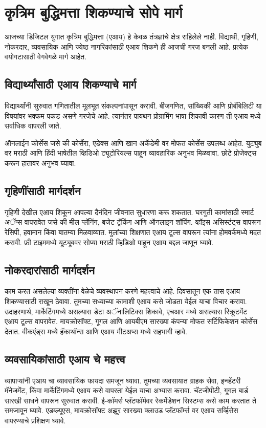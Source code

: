 \chapter{कृत्रिम बुद्धिमत्ता शिकण्याचे सोपे मार्ग}

आजच्या डिजिटल युगात कृत्रिम बुद्धिमत्ता (एआय) हे केवळ तंत्रज्ञांचे क्षेत्र राहिलेले नाही. विद्यार्थी, गृहिणी, नोकरदार, व्यवसायिक आणि ज्येष्ठ नागरिकांसाठी एआय शिकणे ही आजची गरज बनली आहे. प्रत्येक वयोगटासाठी वेगवेगळे मार्ग आहेत.

\section*{विद्यार्थ्यांसाठी एआय शिकण्याचे मार्ग}

विद्यार्थ्यांनी सुरुवात गणितातील मूलभूत संकल्पनांपासून करावी. बीजगणित, सांख्यिकी आणि प्रोबॅबिलिटी या विषयांवर भक्कम पकड असणे गरजेचे आहे. त्यानंतर पायथन प्रोग्रामिंग भाषा शिकावी कारण ती एआय मध्ये सर्वाधिक वापरली जाते.

ऑनलाईन कोर्सेस जसे की कोर्सेरा, एडेक्स  आणि खान अकॅडेमी वर मोफत कोर्सेस उपलब्ध आहेत. युट्युब  वर मराठी आणि हिंदी भाषेतील व्हिडिओ ट्यूटोरियल्स पाहून व्यावहारिक अनुभव मिळवावा. छोटे प्रोजेक्ट्स करून हातावर अनुभव घ्यावा.

\section*{गृहिणींसाठी  मार्गदर्शन}
गृहिणी देखील एआय शिकून आपल्या दैनंदिन जीवनात सुधारणा करू शकतात. घरगुती कामांसाठी स्मार्ट अॅप्स वापरावेत जसे की मील प्लॅनिंग, बजेट ट्रॅकिंग आणि ऑनलाइन शॉपिंग. व्हॉइस असिस्टंट्स वापरून रेसिपी, हवामान किंवा बातम्या मिळवाव्यात. मुलांच्या शिक्षणात एआय टूल्स वापरून त्यांना होमवर्कमध्ये मदत करावी. फ्री टाइममध्ये यूट्यूबवर सोप्या मराठी व्हिडिओ पाहून एआय बद्दल जाणून घ्यावे.

\section*{नोकरदारांसाठी मार्गदर्शन}
काम करत असलेल्या व्यक्तींना वेळेचे व्यवस्थापन करणे महत्त्वाचे आहे. दिवसातून एक तास एआय शिकण्यासाठी राखून ठेवावा. तुमच्या सध्याच्या कामाशी एआय कसे जोडता येईल याचा विचार करावा.
उदाहरणार्थ, मार्केटिंगमध्ये असल्यास डेटा अॅनालिटिक्स शिकावे, एचआर मध्ये असल्यास रिक्रूटमेंट एआय टूल्स वापरावेत. मायक्रोसॉफ्ट, गूगल आणि आयबीएम सारख्या कंपन्या मोफत सर्टिफिकेशन कोर्सेस देतात. वीकएंड्स मध्ये हॅकाथॉन्स आणि एआय मीटअप्स मध्ये सहभागी व्हावे.

\section*{व्यवसायिकांसाठी एआय चे महत्त्व}
व्यापार्‍यांनी एआय चा व्यावसायिक फायदा समजून घ्यावा. तुमच्या व्यवसायात ग्राहक सेवा, इन्व्हेंटरी मॅनेजमेंट, किंवा मार्केटिंगमध्ये एआय कसे वापरता येईल याचा अभ्यास करावा.
चॅटजीपीटी, गूगल बार्ड सारखी साधने वापरून सुरुवात करावी. ई-कॉमर्स प्लॅटफॉर्मवर रेकमेंडेशन सिस्टम्स कसे काम करतात ते समजावून घ्यावे. एडब्ल्यूएस, मायक्रोसॉफ्ट अझूर सारख्या क्लाउड प्लॅटफॉर्म्स वर एआय सर्व्हिसेस वापरण्याचे प्रशिक्षण घ्यावे.

